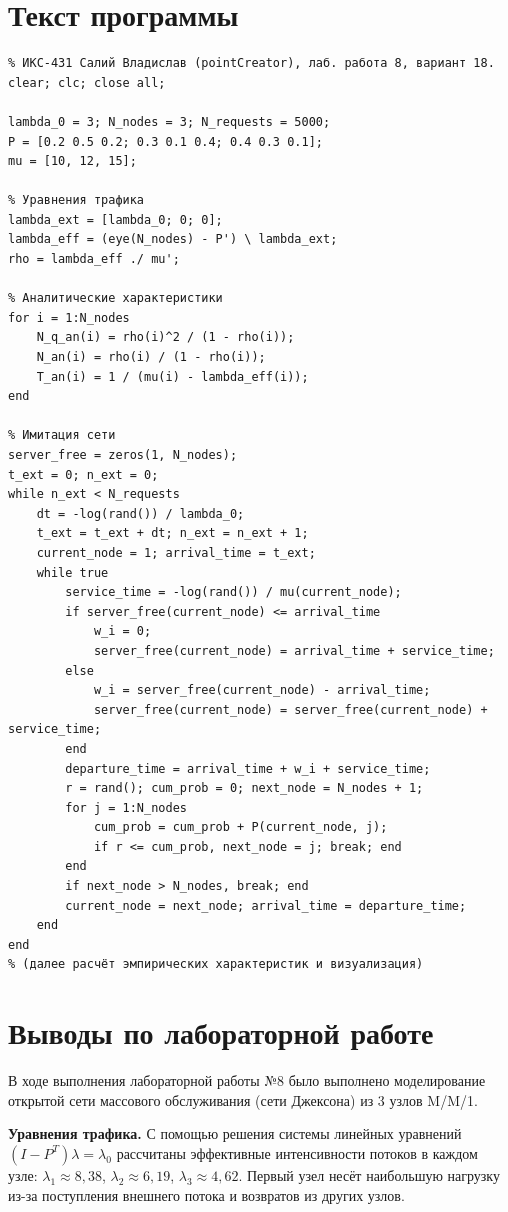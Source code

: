 \section{Текст программы}

\begin{verbatim}
% ИКС-431 Салий Владислав (pointCreator), лаб. работа 8, вариант 18.
clear; clc; close all;

lambda_0 = 3; N_nodes = 3; N_requests = 5000;
P = [0.2 0.5 0.2; 0.3 0.1 0.4; 0.4 0.3 0.1];
mu = [10, 12, 15];

% Уравнения трафика
lambda_ext = [lambda_0; 0; 0];
lambda_eff = (eye(N_nodes) - P') \ lambda_ext;
rho = lambda_eff ./ mu';

% Аналитические характеристики
for i = 1:N_nodes
    N_q_an(i) = rho(i)^2 / (1 - rho(i));
    N_an(i) = rho(i) / (1 - rho(i));
    T_an(i) = 1 / (mu(i) - lambda_eff(i));
end

% Имитация сети
server_free = zeros(1, N_nodes);
t_ext = 0; n_ext = 0;
while n_ext < N_requests
    dt = -log(rand()) / lambda_0;
    t_ext = t_ext + dt; n_ext = n_ext + 1;
    current_node = 1; arrival_time = t_ext;
    while true
        service_time = -log(rand()) / mu(current_node);
        if server_free(current_node) <= arrival_time
            w_i = 0;
            server_free(current_node) = arrival_time + service_time;
        else
            w_i = server_free(current_node) - arrival_time;
            server_free(current_node) = server_free(current_node) + service_time;
        end
        departure_time = arrival_time + w_i + service_time;
        r = rand(); cum_prob = 0; next_node = N_nodes + 1;
        for j = 1:N_nodes
            cum_prob = cum_prob + P(current_node, j);
            if r <= cum_prob, next_node = j; break; end
        end
        if next_node > N_nodes, break; end
        current_node = next_node; arrival_time = departure_time;
    end
end
% (далее расчёт эмпирических характеристик и визуализация)
\end{verbatim}

\section*{Выводы по лабораторной работе}

В ходе выполнения лабораторной работы №8 было выполнено моделирование открытой сети массового обслуживания (сети Джексона) из 3 узлов M/M/1.

\textbf{Уравнения трафика.} С помощью решения системы линейных уравнений $(I - P^T)\lambda = \lambda_0$ рассчитаны эффективные интенсивности потоков в каждом узле: $\lambda_1 \approx 8{,}38$, $\lambda_2 \approx 6{,}19$, $\lambda_3 \approx 4{,}62$. Первый узел несёт наибольшую нагрузку из-за поступления внешнего потока и возвратов из других узлов.

